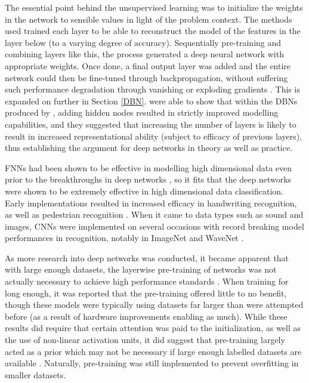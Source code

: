 \documentclass[a4paper,11pt,oneside]{article}
\theoremstyle{plain}
\theoremstyle{definition}
\begin{document}
	The essential point behind the unsupervised learning was to initialize the weights in the network to sensible 
	values in light of the problem context. The methods used trained each layer to be able to reconstruct the model 
	of the features in the layer below (to a varying degree of accuracy). Sequentially pre-training and combining 
	layers like this, the process generated a deep neural network with appropriate weights. Once done, a final output 
	layer was added and the entire network could then be fine-tuned through backpropagation, without suffering 
	such performance degradation through vanishing or exploding gradients \citep{Hinton1, Ranzato1, Hinton2}. This is 
	expanded on further in Section \ref{DBN}. \citet{LeRoux} were able to show that within the DBNs produced by 
	\citet{Hinton1}, adding hidden nodes resulted in strictly improved modelling capabilities, and they suggested 
	that increasing the number of layers is likely to result in increased representational ability (subject to efficacy of 
	previous layers), thus establishing the argument for deep networks in theory as well as practice.
	\hfill \break 
	
	FNNs had been shown to be effective in modelling high dimensional data even prior to the breakthroughs in 
	deep networks \citep{Bengio2}, so it fits that the deep networks were shown to be extremely effective in high dimensional 
	data classification. Early implementations resulted in increased efficacy in handwriting recognition, as well as pedestrian 
	recognition \citep{Sermanet}. When it came to data types such as sound and images, CNNs were implemented on several 
	occasions with record breaking model performances in recognition, notably in ImageNet and WaveNet \citep{ImageNet, WaveNet}.
	\hfill \break 
	
	As more research into deep networks was conducted, it became apparent that with large enough datasets, the
	layerwise pre-training of networks was not actually necessary to achieve high performance standards 
	\citep{ImageNet, Glorot2, Ciresan}. When training for long enough, it was reported that the pre-training offered little to no 
	benefit, though these models were typically using datasets far larger than were attempted before (as a result of
	hardware improvements enabling as much). While these results did require that certain attention was paid to the 
	initialization, as well as the use of non-linear activation units, it did suggest that pre-training largely acted as a prior 
	which may not be necessary if large enough labelled datasets are available \citep{Bengio3}. Naturally, pre-training was still 
	implemented to prevent overfitting in smaller datasets.
	\hfill \break 
	
\end{document}
